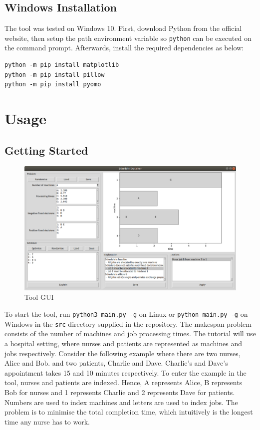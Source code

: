 \subsection{Windows Installation}

The tool was tested on Windows 10. First, download Python from the official website, then setup the path environment variable so \texttt{python} can be executed on the command prompt. Afterwards, install the required dependencies as below: 

\begin{verbatim}
python -m pip install matplotlib
python -m pip install pillow
python -m pip install pyomo
\end{verbatim}

\section{Usage}

\subsection{Getting Started}

\begin{figure}[H]
	\centering
	\includegraphics[width=\linewidth]{figures/tool_gui.png}
	\caption{Tool GUI}
\end{figure}

To start the tool, run \texttt{python3 main.py -g} on Linux or \texttt{python main.py -g} on Windows in the \texttt{src} directory supplied in the repository.
\linespace
The makespan problem consists of the number of machines and job processing times. The tutorial will use a hospital setting, where nurses and patients are represented as machines and jobs respectively. Consider the following example where there are two nurses, Alice and Bob. and two patients, Charlie and Dave. Charlie's and Dave's appointment takes 15 and 10 minutes respectively. To enter the example in the tool, nurses and patients are indexed. Hence, A represents Alice, B represents Bob for nurses and 1 represents Charlie and 2 represents Dave for patients. Numbers are used to index machines and letters are used to index jobs. The problem is to minimise the total completion time, which intuitively is the longest time any nurse has to work.

